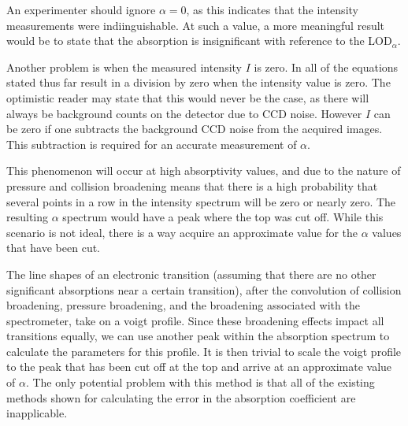 An experimenter should ignore $\alpha = 0$, as this indicates that the
intensity measurements were indiinguishable. At such a value, a more meaningful
result would be to state that the absorption is insignificant with reference to
the LOD$_{\alpha}$.

Another problem is when the measured intensity $I$ is zero. In all of the
equations stated thus far result in a division by zero when the intensity
value is zero. The optimistic reader may state that this would never be
the case, as there will always be background counts on the detector due to
\ac{CCD} noise. However $I$ can be zero if one subtracts the background
\ac{CCD} noise from the acquired images. This subtraction is required for an
accurate measurement of $\alpha$.

This phenomenon will occur at high absorptivity values, and due to the nature
of pressure and collision broadening means that there is a high probability
that several points in a row in the intensity spectrum will be zero or nearly
zero. The resulting $\alpha$ spectrum would have a peak where the top was cut
off. While this scenario is not ideal, there is a way acquire an approximate
value for the $\alpha$ values that have been cut.

The line shapes of an electronic transition (assuming that there are no other
significant absorptions near a certain transition), after the convolution of
collision broadening, pressure broadening, and the broadening associated with
the spectrometer, take on a voigt profile. Since these broadening effects
impact all transitions equally, we can use another peak within the absorption
spectrum to calculate the parameters for this profile. It is then trivial to
scale the voigt profile to the peak that has been cut off at the top and
arrive at an approximate value of $\alpha$. The only potential problem with
this method is that all of the existing methods shown for calculating the
error in the absorption coefficient are inapplicable.
